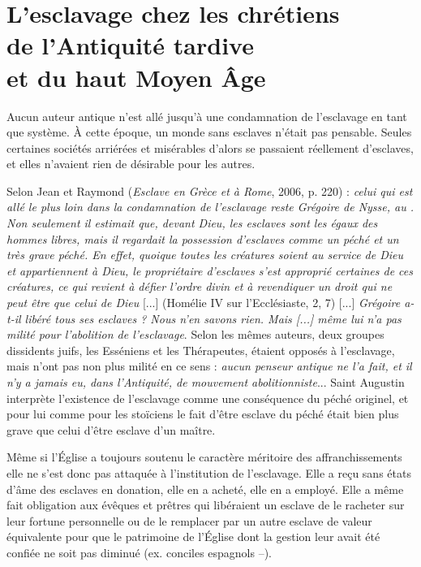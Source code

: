

\chapter[L'esclavage chez les chrétiens de l'Antiquité tardive et du haut Moyen Âge]{L'esclavage chez les chrétiens\\de l'Antiquité tardive\\et du haut Moyen Âge}


 Aucun auteur antique n'est allé jusqu'à une condamnation de l'esclavage en tant que système. À cette époque, un monde sans esclaves n'était pas pensable. Seules certaines sociétés arriérées et misérables d'alors se passaient réellement d'esclaves, et elles n'avaient rien de désirable pour les autres. 

 Selon Jean  et Raymond  (\emph{Esclave en Grèce et à Rome}, 2006, p. 220) : \emph{celui qui est allé le plus loin dans la condamnation de l'esclavage reste Grégoire de Nysse, au . Non seulement il estimait que, devant Dieu, les esclaves sont les égaux des hommes libres, mais il regardait la possession d'esclaves comme un péché et un très grave péché. En effet, quoique toutes les créatures soient au service de Dieu et appartiennent à Dieu, le propriétaire d'esclaves s'est approprié certaines de ces créatures, ce qui revient à défier l'ordre divin et à revendiquer un droit qui ne peut être que celui de Dieu} [...] (Homélie IV sur l'Ecclésiaste, 2, 7) [...] \emph{Grégoire a-t-il libéré tous ses esclaves ? Nous n'en savons rien. Mais \emph{[...]} même lui n'a pas milité pour l'abolition de l'esclavage}. Selon les mêmes auteurs, deux groupes dissidents juifs, les Esséniens et les Thérapeutes, étaient opposés à l'esclavage, mais n'ont pas non plus milité en ce sens : \emph{aucun penseur antique ne l'a fait, et il n'y a jamais eu, dans l'Antiquité, de mouvement abolitionniste}... Saint Augustin interprète l'existence de l'esclavage comme une conséquence du péché originel, et pour lui comme pour les stoïciens le fait d'être esclave du péché était bien plus grave que celui d'être esclave d'un maître. 
 
 Même si l'Église a toujours soutenu le caractère méritoire des affranchissements elle ne s'est donc pas attaquée à l'institution de l'esclavage. Elle a reçu sans états d'âme des esclaves en donation, elle en a acheté, elle en a employé. Elle a même fait obligation aux évêques et prêtres qui libéraient un esclave de le racheter sur leur fortune personnelle ou de le remplacer par un autre esclave de valeur équivalente pour que le patrimoine de l’Église dont la gestion leur avait été confiée ne soit pas diminué (ex. conciles espagnols --). 


